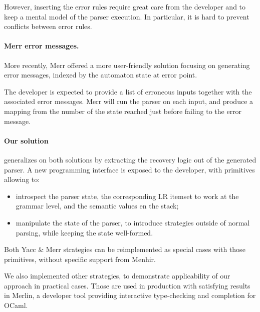 \documentclass[twoside,a4paper]{article}
\begin{document}
However, inserting the error rules require great care from the developer and to
keep a mental model of the parser execution.  In particular, it is hard to
prevent conflicts between error rules.

\paragraph{Merr error messages.}
More recently, Merr offered a more user-friendly solution focusing on
generating error messages, indexed by the automaton state at error point. 

The developer is expected to provide a list of erroneous inputs together with
the associated error messages.  Merr will run the parser on each input, and
produce a mapping from the number of the state reached just before failing to
the error message.

\paragraph{Our solution} generalizes on both solutions by extracting the
recovery logic out of the generated parser.  A new programming interface is
exposed to the developer, with primitives allowing to:

\begin{itemize}
  \item introspect the parser state, the corresponding LR itemset to work at
    the grammar level, and the semantic values en the stack;
  \item manipulate the state of the parser, to introduce strategies outside of
    normal parsing, while keeping the state well-formed.
\end{itemize}

Both Yacc \& Merr strategies can be reimplemented as special cases with those
primitives, without specific support from Menhir.

We also implemented other strategies, to demonstrate applicability of our
approach in practical cases.  Those are used in production with satisfying
results in Merlin, a developer tool providing interactive type-checking and
completion for OCaml.

\end{document}
